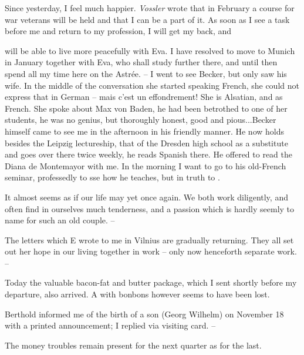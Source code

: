 
Since yesterday, I feel much happier. \textit{Vossler} wrote that in February a course for war veterans will be held and that I can be a part of it. As soon as I see a task before me and return to my profession, I will get my  back, and 

will be able to live more peacefully with Eva. I have resolved to move to Munich in January together with Eva, who shall study further there, and until then spend all my time here on the Astrée. --  I went to see Becker, but only saw his wife. In the middle of the conversation she started speaking French, she could not express that in German -- mais c'est un effondrement! She is Alsatian, and  as French. She spoke about Max von Baden, he had been betrothed to one of her students, he was no genius, but thoroughly honest, good and pious...Becker himself came to see me in the afternoon in his friendly manner. He now holds besides the Leipzig lectureship, that of the Dresden high school as a substitute and goes over there twice weekly, he reads Spanish there. He offered to read the Diana de Montemayor with me. In the morning I want to go to his old-French seminar, professedly to sse how he teaches, but in truth to .
\missing

It almost seems as if our life may yet  once again. We both work diligently, and often find in ourselves much tenderness, and a passion which is hardly seemly to name for such an old couple. --

The letters which E wrote to me in Vilnius are gradually returning. They all set out her hope in our living together in work -- only now  henceforth separate work. --

Today the valuable bacon-fat and butter package, which I sent shortly before my departure, also arrived. A  with bonbons however seems to have been lost.

\missing

Berthold informed me of the birth of a son (Georg Wilhelm) on November 18 with a printed announcement; I replied via visiting card. --

The money troubles remain present for the next quarter as for the last.

